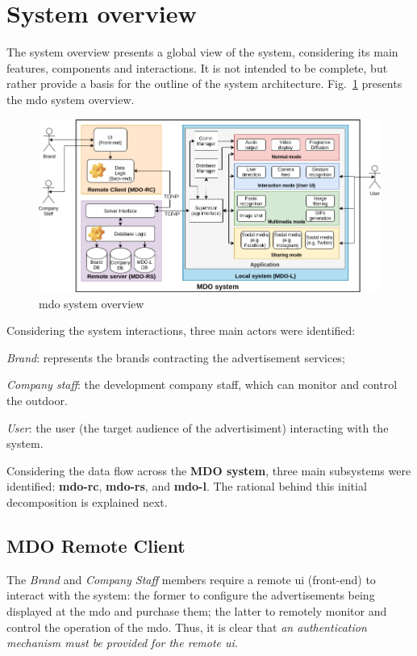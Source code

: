 %
\section{System overview}
\label{sec:system-overview}
The system overview presents a global view of the system, considering its main
features, components and interactions. It is not intended to be complete, but
rather provide a basis for the outline of the system architecture.
Fig.~\ref{fig:sys-overview} presents the \gls{mdo} system overview.
%
\begin{figure}[htb!]
\centering
    \includegraphics[width=1.0\columnwidth]{./img/sys-overview.png}
  \caption{\gls{mdo} system overview}%
\label{fig:sys-overview}
\end{figure}

Considering the system interactions, three main actors were identified:
\begin{enum-c}
\item \emph{Brand}: represents the brands contracting the advertisement
  services;
\item \emph{Company staff}: the development company staff, which can monitor and
  control the outdoor.
\item \emph{User}: the user (the target audience of the advertisiment)
  interacting with the system.
\end{enum-c}

Considering the data flow across the \textbf{MDO system}, three main subsystems were
identified: \textbf{\gls{mdo-rc}}, \textbf{\gls{mdo-rs}}, and
\textbf{\gls{mdo-l}}. The rational behind this initial decomposition is
explained next.

\subsection{MDO Remote Client}
The \emph{Brand} and \emph{Company Staff} members require a remote \gls{ui} (front-end) to
interact with the system: the former to configure the advertisements being
displayed at the \gls{mdo} and purchase them; the latter to remotely monitor and
control the operation of the \gls{mdo}. Thus, it is clear that \emph{an
  authentication mechanism must be provided for the remote \gls{ui}}.

